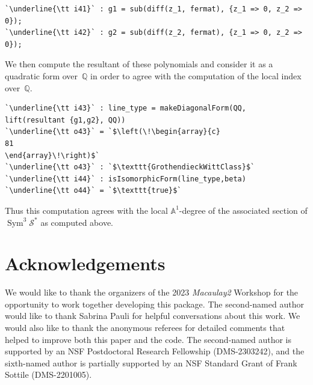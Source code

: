 \documentclass[12pt]{amsart}
\theoremstyle{definition}
\providecommand{\A}{\mathbb{A}}
\DeclareMathOperator{\Sym}{Sym}
\begin{document}
\begin{lstlisting}[language=Macaulay2output]
`\underline{\tt i41}` : g1 = sub(diff(z_1, fermat), {z_1 => 0, z_2 => 0});
`\underline{\tt i42}` : g2 = sub(diff(z_2, fermat), {z_1 => 0, z_2 => 0});
\end{lstlisting}
We then compute the resultant of these polynomials and consider it as a quadratic form over~$\mathbb{Q}$ in order to agree with the computation of the local index over~$\mathbb{Q}$.
\begin{lstlisting}[language=Macaulay2output]
`\underline{\tt i43}` : line_type = makeDiagonalForm(QQ, lift(resultant {g1,g2}, QQ))
`\underline{\tt o43}` = `$\left(\!\begin{array}{c}
81
\end{array}\!\right)$`
`\underline{\tt o43}` : `$\texttt{GrothendieckWittClass}$`
`\underline{\tt i44}` : isIsomorphicForm(line_type,beta)
`\underline{\tt o44}` = `$\texttt{true}$`
\end{lstlisting}
Thus this computation agrees with the local $\A^1$-degree of the associated section of $\Sym^3 \mathcal{S}^\ast$ as computed above.

\section*{Acknowledgements}

We would like to thank the organizers of the 2023 \emph{Macaulay2} Workshop for the opportunity to work together developing this package. The second-named author would like to thank Sabrina Pauli for helpful conversations about this work. We would also like to thank the anonymous referees for detailed comments that helped to improve both this paper and the code. The second-named author is supported by an NSF Postdoctoral Research Fellowship (DMS-2303242), and the sixth-named author is partially supported by an NSF Standard Grant of Frank Sottile (DMS-2201005).



\end{document}
